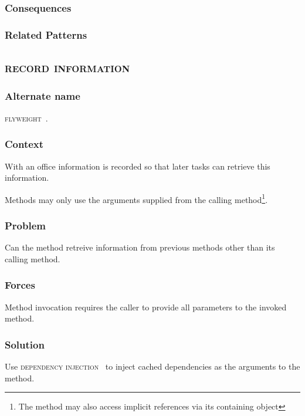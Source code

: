 \documentclass[prodmode]{style/acmlarge}
\begin{document}
\subsubsection*{Consequences}

\subsubsection*{Related Patterns}


\subsection{\textsc{\textbf{record information}}}

\subsubsection*{Alternate name}

\textsc{flyweight}~\cite{gof}.

\subsubsection*{Context}

With an office information is recorded so that later tasks can retrieve this
information.

Methods may only use the arguments supplied from the calling method\footnote{The
method may also access implicit references via its containing object}.

\subsubsection*{Problem}

Can the method retreive information from previous methods other than its calling
method.

\subsubsection*{Forces}

Method invocation requires the caller to provide all parameters to the invoked
method.

\subsubsection*{Solution}

Use \textsc{dependency injection}~\cite{ioc} to inject cached dependencies as
the arguments to the method.
\end{document}
